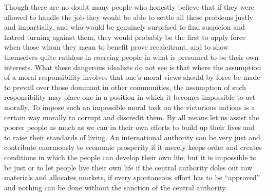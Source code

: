 \documentclass[11pt,openany]{book}
\begin{document}
Though there are no doubt many people who honestly believe that if they were allowed to handle the job they would be able to settle all these problems justly and impartially, and who would be genuinely surprised to find suspicion and hatred turning against them, they would probably be the first to apply force when those whom they mean to benefit prove recalcitrant, and to show themselves quite ruthless in coercing people in what is presumed to be their own interests. What these dangerous idealists do not see is that where the assumption of a moral responsibility involves that one's moral views should by force be made to prevail over those dominant in other communities, the assumption of such responsibility may place one in a position in which it becomes impossible to act morally. To impose such an impossible moral task on the victorious nations is a certain way morally to corrupt and discredit them. By all means let us assist the poorer people as much as we can in their own efforts to build up their lives and to raise their standards of living. An international authority can be very just and contribute enormously to economic prosperity if it merely keeps order and creates conditions in which the people can develop their own life; but it is impossible to be just or to let people live their own life if the central authority doles out raw materials and allocates markets, if every spontaneous effort has to be ``approved'' and nothing can be done without the sanction of the central authority.

\begin{center}\textasteriskcentered\hspace{0.9em}\textasteriskcentered\hspace{0.9em}\textasteriskcentered\end{center}

\begin{center}\textasteriskcentered\hspace{0.9em}\textasteriskcentered\hspace{0.9em}\textasteriskcentered\end{center}

\begin{center}\textasteriskcentered\hspace{0.9em}\textasteriskcentered\hspace{0.9em}\textasteriskcentered\end{center}

\begin{center}\textasteriskcentered\hspace{0.9em}\textasteriskcentered\hspace{0.9em}\textasteriskcentered\end{center}
\end{document}
